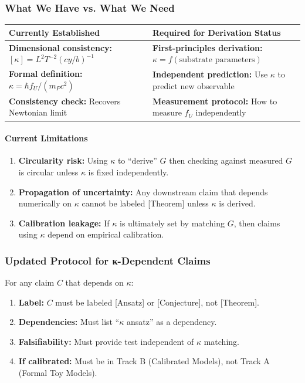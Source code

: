 \documentclass[11pt,titlepage]{article}
\begin{document}
\subsubsection{What We Have vs. What We Need}

\begin{tabular}{p{}p{}}
\textbf{Currently Established} & \textbf{Required for Derivation Status} \\ \hline
\textbf{Dimensional consistency:} $[\kappa] = L^2 T^{-2} (cy/b)^{-1}$ & \textbf{First-principles derivation:} $\kappa = f(\text{substrate parameters})$ \\
\textbf{Formal definition:} $\kappa = \hbar f_U / (m_P c^2)$ & \textbf{Independent prediction:} Use $\kappa$ to predict new observable \\
\textbf{Consistency check:} Recovers Newtonian limit & \textbf{Measurement protocol:} How to measure $f_U$ independently \\
\end{tabular}

\paragraph{Current Limitations}
\begin{enumerate}
\item \textbf{Circularity risk:} Using $\kappa$ to ``derive'' $G$ then checking against measured $G$ is circular unless $\kappa$ is fixed independently.

\item \textbf{Propagation of uncertainty:} Any downstream claim that depends numerically on $\kappa$ cannot be labeled [Theorem] unless $\kappa$ is derived.

\item \textbf{Calibration leakage:} If $\kappa$ is ultimately set by matching $G$, then claims using $\kappa$ depend on empirical calibration.
\end{enumerate}

\subsubsection{Updated Protocol for κ-Dependent Claims}

\begin{tcolorbox}[colback=yellow!5!white,colframe=yellow!75!black,title=Protocol: Handling κ-Dependent Claims]
For any claim $C$ that depends on $\kappa$:
\begin{enumerate}
\item \textbf{Label:} $C$ must be labeled [Ansatz] or [Conjecture], not [Theorem].
\item \textbf{Dependencies:} Must list ``$\kappa$ ansatz'' as a dependency.
\item \textbf{Falsifiability:} Must provide test independent of $\kappa$ matching.
\item \textbf{If calibrated:} Must be in Track B (Calibrated Models), not Track A (Formal Toy Models).
\end{enumerate}
\end{tcolorbox}
\end{document}
